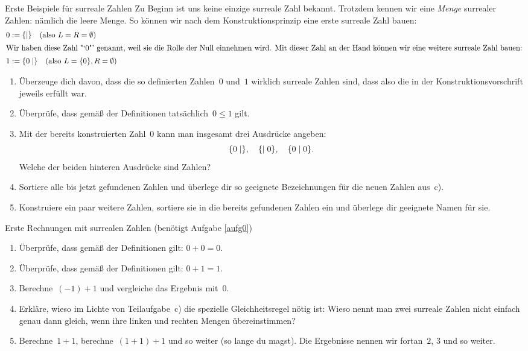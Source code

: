 \documentclass{../zirkelblatt}
\begin{document}
\begin{aufgabe}{Erste Beispiele für surreale Zahlen}
\label{aufg0}
Zu Beginn ist uns keine einzige surreale Zahl bekannt. Trotzdem kennen wir
eine \emph{Menge} surrealer Zahlen: nämlich die leere Menge. So können wir nach
dem Konstruktionsprinzip eine erste surreale Zahl bauen:
\begin{align*}
  0 &:= \{  \mathrel{|}  \} \quad\text{(also $L = R = \emptyset$)} \\
\intertext{Wir haben diese Zahl~"`$0$"' genannt, weil sie die Rolle der Null einnehmen
wird. Mit dieser Zahl an der Hand können wir eine weitere surreale Zahl bauen:}
  1 &:= \{ 0 \mathrel{|}  \} \quad\text{(also $L = \{ 0 \}, R = \emptyset$)}
\end{align*}

\begin{enumerate}
\item Überzeuge dich davon, dass die so definierten Zahlen~$0$ und~$1$ wirklich
surreale Zahlen sind, dass also die  in der Konstruktionsvorschrift
jeweils erfüllt war.

\item Überprüfe, dass gemäß der Definitionen tatsächlich~$0 \leq 1$ gilt.

\item Mit der bereits konstruierten Zahl~$0$ kann man insgesamt drei Ausdrücke
angeben:
\[ \{ 0 \mathrel{|}  \}, \quad \{  \mathrel{|} 0 \}, \quad \{ 0 \mathrel{|} 0 \}. \]
Welche der beiden hinteren Ausdrücke sind Zahlen?

\item Sortiere alle bis jetzt gefundenen Zahlen und überlege dir so geeignete
Bezeichnungen für die neuen Zahlen aus~c).

\item Konstruiere ein paar weitere Zahlen, sortiere sie in die bereits
gefundenen Zahlen ein und überlege dir geeignete Namen für sie.
\end{enumerate}
\end{aufgabe}

\begin{aufgabe}{Erste Rechnungen mit surrealen Zahlen (benötigt Aufgabe \ref{aufg0})}
\label{erste-rechnungen}
\begin{enumerate}
\item Überprüfe, dass gemäß der Definitionen gilt: $0 + 0 = 0$.
\item Überprüfe, dass gemäß der Definitionen gilt: $0 + 1 = 1$.
\item Berechne~$(-1) + 1$ und vergleiche das Ergebnis mit~$0$.
\item Erkläre, wieso im Lichte von Teilaufgabe~c) die spezielle
Gleichheitsregel nötig ist: Wieso nennt man zwei surreale Zahlen nicht einfach
genau dann gleich, wenn ihre linken und rechten Mengen übereinstimmen?
\item Berechne~$1 + 1$, berechne~$(1 + 1) + 1$ und so weiter (so lange du
magst). Die Ergebnisse nennen wir fortan~$2$, $3$ und so weiter.
\end{enumerate}
\end{aufgabe}
\end{document}
